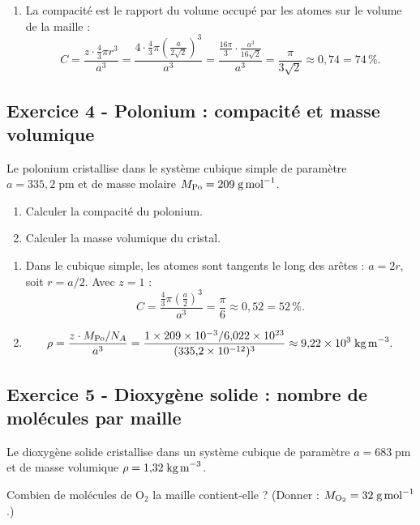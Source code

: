 \documentclass[12pt,a4paper]{article}
\begin{document}
\begin{boitecorrige}
\begin{enumerate}
\item La compacité est le rapport du volume occupé par les atomes sur le volume de la maille :
\[
C = \frac{z \cdot \frac{4}{3}\pi r^3}{a^3}
= \frac{4 \cdot \frac{4}{3}\pi\left(\frac{a}{2\sqrt{2}}\right)^3}{a^3}
= \frac{\frac{16\pi}{3}\cdot\frac{a^3}{16\sqrt{2}}}{a^3}
= \frac{\pi}{3\sqrt{2}} \approx 0{,}74 = 74\,\%.
\]
\end{enumerate}
\end{boitecorrige}

\subsection*{Exercice 4 - Polonium : compacité et masse volumique \niveau{\moyen}}

\begin{boiteexercice}
\niveau{\moyen}
Le polonium cristallise dans le système cubique simple de paramètre $a = 335{,}2\;\text{pm}$ et de masse molaire $M_\text{Po} = 209\;\text{g\,mol}^{-1}$.
\begin{enumerate}
  \item Calculer la compacité du polonium.
  \item Calculer la masse volumique du cristal.
\end{enumerate}
\end{boiteexercice}

\begin{boitecorrige}
\begin{enumerate}
\item Dans le cubique simple, les atomes sont tangents le long des arêtes : $a = 2r$, soit $r = a/2$. Avec $z=1$ :
\[
C = \frac{\frac{4}{3}\pi\left(\frac{a}{2}\right)^3}{a^3} = \frac{\pi}{6} \approx 0{,}52 = 52\,\%.
\]

\item
\[
\rho = \frac{z\cdot M_\text{Po}/N_A}{a^3}
= \frac{1 \times 209\times10^{-3}/6{,}022\times10^{23}}{(335{,}2\times10^{-12})^3}
\approx 9{,}22\times10^3\;\text{kg\,m}^{-3}.
\]
\end{enumerate}
\end{boitecorrige}

\subsection*{Exercice 5 - Dioxygène solide : nombre de molécules par maille \niveau{\facile}}

\begin{boiteexercice}
\niveau{\facile}
Le dioxygène solide cristallise dans un système cubique de paramètre $a = 683\;\text{pm}$ et de masse volumique $\rho = 1{,}32\;\text{kg\,m}^{-3}$.

Combien de molécules de $\text{O}_2$ la maille contient-elle ? (Donner : $M_{\text{O}_2} = 32\;\text{g\,mol}^{-1}$.)
\end{boiteexercice}
\end{document}
